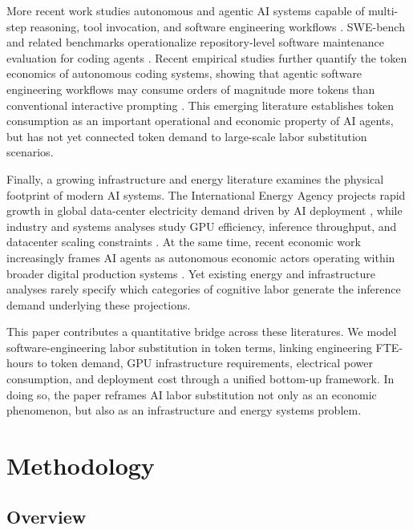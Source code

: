 \documentclass{article}
\begin{document}
More recent work studies autonomous and agentic AI systems capable of multi-step reasoning, tool invocation, and software engineering workflows \citep{wang2025agentic, patil2025bfcl}. SWE-bench and related benchmarks operationalize repository-level software maintenance evaluation for coding agents \citep{jimenez2024swebench}. Recent empirical studies further quantify the token economics of autonomous coding systems, showing that agentic software engineering workflows may consume orders of magnitude more tokens than conventional interactive prompting \citep{salim2026tokenomics, bai2026agent}. This emerging literature establishes token consumption as an important operational and economic property of AI agents, but has not yet connected token demand to large-scale labor substitution scenarios.

Finally, a growing infrastructure and energy literature examines the physical footprint of modern AI systems. The International Energy Agency projects rapid growth in global data-center electricity demand driven by AI deployment \citep{iea2024energy}, while industry and systems analyses study GPU efficiency, inference throughput, and datacenter scaling constraints \citep{lbnl2024datacenter, nvidia2024h100brief}. At the same time, recent economic work increasingly frames AI agents as autonomous economic actors operating within broader digital production systems \citep{rothschild2025agentic}. Yet existing energy and infrastructure analyses rarely specify which categories of cognitive labor generate the inference demand underlying these projections.

This paper contributes a quantitative bridge across these literatures. We model software-engineering labor substitution in token terms, linking engineering FTE-hours to token demand, GPU infrastructure requirements, electrical power consumption, and deployment cost through a unified bottom-up framework. In doing so, the paper reframes AI labor substitution not only as an economic phenomenon, but also as an infrastructure and energy systems problem.

\section{Methodology}
\label{sec:methodology}

\subsection{Overview}
\label{sec:overview}
\end{document}

